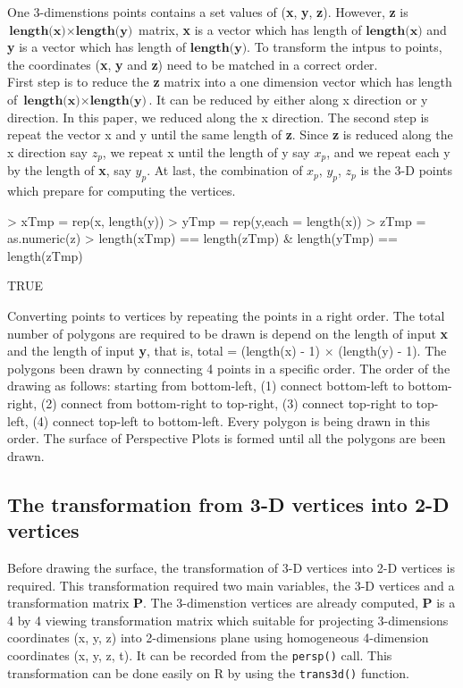 \documentclass[11pt,twoside]{report}
\begin{document}
One 3-dimenstions points contains a set values of (\textbf{x}, \textbf{y}, \textbf{z}). However, \textbf{z} is $\textbf{length(x)} \times \textbf{length(y)}$ matrix, \textbf{x} is a vector which has length of $\textbf{length(x)}$ and \textbf{y} is a vector which has length of $\textbf{length(y)}$. To transform the intpus to points, the coordinates (\textbf{x}, \textbf{y} and \textbf{z}) need to be matched in a correct order.\\

First step is to reduce the \textbf{z} matrix into a one dimension vector which has length of $\textbf{length(x)} \times \textbf{length(y)}$. It can be reduced by either along x direction or y direction. In this paper, we reduced along the x direction. The second step is repeat the vector x and y until the same length of \textbf{z}. Since \textbf{z} is reduced along the x direction say $z_p$, we repeat x until the length of y say $x_p$, and we repeat each y by the length of \textbf{x}, say $y_p$. At last, the combination of $x_p$, $y_p$, $z_p$ is the 3-D points which prepare for computing the vertices. 
\begin{Schunk}
\begin{Sinput}
> xTmp = rep(x, length(y))
> yTmp = rep(y,each = length(x))
> zTmp = as.numeric(z)
> length(xTmp) == length(zTmp) & length(yTmp) == length(zTmp)
\end{Sinput}
\begin{Soutput}
[1] TRUE
\end{Soutput}
\end{Schunk}

Converting points to vertices by repeating the points in a right order. The total number of polygons are required to be drawn is depend on the length of input \textbf{x} and the length of input \textbf{y}, that is, total = (length(x) - 1) $\times$ (length(y) - 1). The polygons been drawn by connecting 4 points in a specific order. The order of the drawing as follows: starting from bottom-left, (1) connect bottom-left to bottom-right, (2) connect from bottom-right to top-right, (3) connect top-right to top-left, (4) connect top-left to bottom-left. Every polygon is being drawn in this order. The surface of Perspective Plots is formed until all the polygons are been drawn. \\

\subsection{The transformation from 3-D vertices into 2-D vertices}
Before drawing the surface, the transformation of 3-D vertices into 2-D vertices is required. This transformation required two main variables, the 3-D vertices and a transformation matrix \textbf{P}. The 3-dimenstion vertices are already computed, \textbf{P} is a 4 by 4 viewing transformation matrix which suitable for projecting 3-dimensions coordinates (x, y, z) into 2-dimensions plane using homogeneous 4-dimension coordinates (x, y, z, t). It can be recorded from the \texttt{persp()} call. This transformation can be done easily on R by using the \texttt{trans3d()} function.
\end{document}
